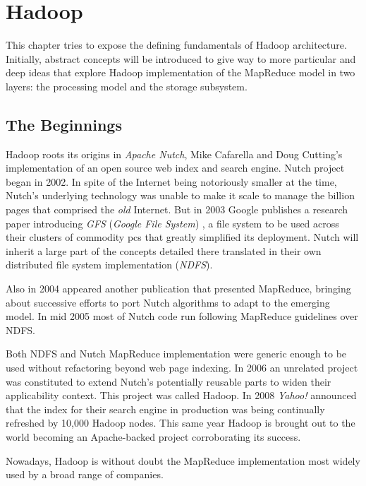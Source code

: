 \chapter{Hadoop}\label{cap:hadoop}
\noindent This chapter tries to expose the defining fundamentals of Hadoop architecture. Initially, abstract concepts will be introduced to give way to more particular and deep ideas that explore Hadoop implementation of the MapReduce model in two layers: the processing model and the storage subsystem.

\section{The Beginnings}\label{sec:origen}
\noindent Hadoop roots its origins in \emph{Apache Nutch}, Mike Cafarella and Doug Cutting's implementation of an open source web index and search engine. Nutch project began in 2002. In spite of the Internet being notoriously smaller at the time, Nutch's underlying technology was unable to make it scale to manage the billion pages that comprised the \emph{old} Internet. But in 2003 Google publishes a research paper introducing \emph{GFS} (\emph{Google File System}) \cite{gfs}, a file system to be used across their clusters of commodity pcs that greatly simplified its deployment. Nutch will inherit a large part of the concepts detailed there translated in their own distributed file system implementation (\emph{NDFS}).

Also in 2004 appeared another publication \cite{googlemapreduce} that presented MapReduce, bringing about successive efforts to port Nutch algorithms to adapt to the emerging model. In mid 2005 most of Nutch code run following MapReduce guidelines over NDFS.

Both NDFS and Nutch MapReduce implementation were generic enough to be used without refactoring beyond web page indexing. In 2006 an unrelated project was constituted to extend Nutch's potentially reusable parts to widen their applicability context. This project was called Hadoop. In 2008 \emph{Yahoo!} announced that the index for their search engine in production was being continually refreshed by 10,000 Hadoop nodes. This same year Hadoop is brought out to the world becoming an Apache-backed project corroborating its success.

Nowadays, Hadoop is without doubt the MapReduce implementation most widely used by a broad range of companies.

